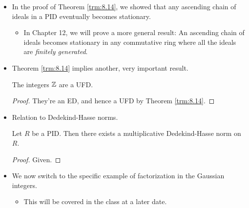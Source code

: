 \documentclass[../notes.tex]{subfiles}
\begin{document}
\begin{itemize}
\begin{theorem}
\begin{proof}
            Returning to the original case, the above result implies a contradiction. Thus, the original chain of ideals terminates. Therefore, a factorization of $r$ into irreducibles is finite and, importantly, \emph{exists}.\par\smallskip
            \underline{Uniqueness}: Since $R$ is a PID, Proposition \ref{prp:8.11} implies that all irreducible elements are prime. Therefore, by Lemma* from Lecture 4.2, any two factorizations of $r$ are equivalent, as desired. Note that \textcite{bib:DummitFoote} proves their own version of Lemma* as part of the argument.\par\smallskip
            The second statement follows from the first and Proposition \ref{prp:8.1}.
        \end{proof}
    \end{theorem}
    \item In the proof of Theorem \ref{trm:8.14}, we showed that any ascending chain of ideals in a PID eventually becomes stationary.
    \begin{itemize}
        \item In Chapter 12, we will prove a more general result: An ascending chain of ideals becomes stationary in any commutative ring where all the ideals are \emph{finitely generated}.
    \end{itemize}
    \item Theorem \ref{trm:8.14} implies another, very important result.
    \begin{corollary}\label{cly:8.15}
        The integers $\mathbb{Z}$ are a UFD.
        \begin{proof}
            They're an ED, and hence a UFD by Theorem \ref{trm:8.14}.
        \end{proof}
    \end{corollary}
    \item Relation to Dedekind-Hasse norms.
    \begin{corollary}\label{cly:8.16}
        Let $R$ be a PID. Then there exists a multiplicative Dedekind-Hasse norm on $R$.
        \begin{proof}
            Given.
        \end{proof}
    \end{corollary}
    \item We now switch to the specific example of factorization in the Gaussian integers.
    \begin{itemize}
        \item This will be covered in the class at a later date.

\end{itemize}
\end{itemize}
\end{document}
